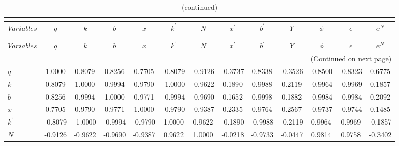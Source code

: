  
\begin{center}
\begin{longtable}{lcccccccccccc} 
\caption{MATRIX OF CORRELATIONS}\\
 \label{Table:th_corr_matrix}\\
\toprule 
$Variables  $	 & 	 $           q$	 & 	 $           k$	 & 	 $           b$	 & 	 $           x$	 & 	 $   k^\prime$	 & 	 $           N$	 & 	 $   x^\prime$	 & 	 $   b^\prime$	 & 	 $           Y$	 & 	 $       \phi$	 & 	 $   \epsilon$	 & 	 $         e^N$\\
\midrule \endfirsthead 
\caption{(continued)}\\
 \toprule \\ 
$Variables  $	 & 	 $           q$	 & 	 $           k$	 & 	 $           b$	 & 	 $           x$	 & 	 $   k^\prime$	 & 	 $           N$	 & 	 $   x^\prime$	 & 	 $   b^\prime$	 & 	 $           Y$	 & 	 $       \phi$	 & 	 $   \epsilon$	 & 	 $         e^N$\\
\midrule \endhead 
\midrule \multicolumn{13}{r}{(Continued on next page)} \\ \bottomrule \endfoot 
\bottomrule \endlastfoot 
$q          $	 & 	      1.0000	 & 	      0.8079	 & 	      0.8256	 & 	      0.7705	 & 	     -0.8079	 & 	     -0.9126	 & 	     -0.3737	 & 	      0.8338	 & 	     -0.3526	 & 	     -0.8500	 & 	     -0.8323	 & 	      0.6775 \\ 
$k          $	 & 	      0.8079	 & 	      1.0000	 & 	      0.9994	 & 	      0.9790	 & 	     -1.0000	 & 	     -0.9622	 & 	      0.1890	 & 	      0.9988	 & 	      0.2119	 & 	     -0.9964	 & 	     -0.9969	 & 	      0.1857 \\ 
$b          $	 & 	      0.8256	 & 	      0.9994	 & 	      1.0000	 & 	      0.9771	 & 	     -0.9994	 & 	     -0.9690	 & 	      0.1652	 & 	      0.9998	 & 	      0.1882	 & 	     -0.9984	 & 	     -0.9984	 & 	      0.2092 \\ 
$x          $	 & 	      0.7705	 & 	      0.9790	 & 	      0.9771	 & 	      1.0000	 & 	     -0.9790	 & 	     -0.9387	 & 	      0.2335	 & 	      0.9764	 & 	      0.2567	 & 	     -0.9737	 & 	     -0.9744	 & 	      0.1485 \\ 
$k^\prime   $	 & 	     -0.8079	 & 	     -1.0000	 & 	     -0.9994	 & 	     -0.9790	 & 	      1.0000	 & 	      0.9622	 & 	     -0.1890	 & 	     -0.9988	 & 	     -0.2119	 & 	      0.9964	 & 	      0.9969	 & 	     -0.1857 \\ 
$N          $	 & 	     -0.9126	 & 	     -0.9622	 & 	     -0.9690	 & 	     -0.9387	 & 	      0.9622	 & 	      1.0000	 & 	     -0.0218	 & 	     -0.9733	 & 	     -0.0447	 & 	      0.9814	 & 	      0.9758	 & 	     -0.3402 \\ 

\end{longtable}
\end{center}

